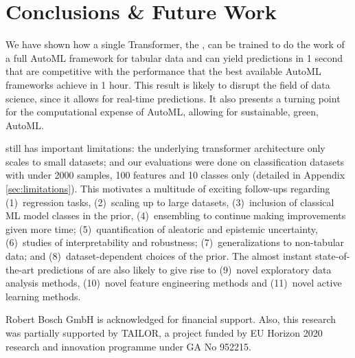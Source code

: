 \documentclass{article}
\begin{document}

\section{Conclusions \& Future Work}
We have shown how a single Transformer, the \methodname{}, can be trained to do the work of a full AutoML framework for tabular data and can yield predictions in 1 second that are competitive with the performance that the best available AutoML frameworks achieve in 1 hour.
This result is likely to disrupt the field of data science, since it allows for real-time predictions. It also presents a turning point for the computational expense of AutoML, allowing for sustainable, green, AutoML.

\methodname{} still has important limitations: the underlying transformer architecture only scales to small datasets; and our evaluations were done on classification datasets with under 2000 samples, 100 features and 10 classes only (detailed in Appendix \ref{sec:limitations}). This motivates a multitude of exciting follow-ups regarding (1)~regression tasks, (2)~scaling up to large datasets, (3)~inclusion of classical ML model classes in the prior, (4)~ensembling to continue making improvements given more time; (5)~quantification of aleatoric and epistemic uncertainty, (6)~studies of interpretability and robustness; (7)~generalizations to non-tabular data; and (8)~dataset-dependent choices of the prior. The almost instant state-of-the-art predictions of \methodname{} are also likely to give rise to (9)~novel exploratory data analysis methods, (10)~novel feature engineering methods and (11)~novel active learning methods.

\newpage

\begin{ack}
Robert Bosch GmbH is acknowledged for financial support. Also, this research was partially supported by TAILOR, a project funded by EU Horizon 2020 research and innovation programme under GA No 952215.
\end{ack}
\end{document}
